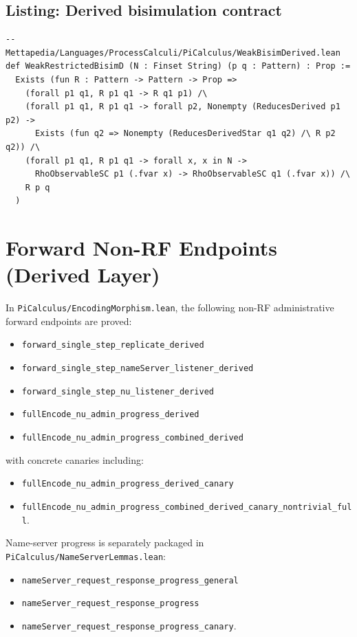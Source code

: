 \documentclass[11pt]{article}
\begin{document}
\subsection*{Listing: Derived bisimulation contract}
\begin{lstlisting}
-- Mettapedia/Languages/ProcessCalculi/PiCalculus/WeakBisimDerived.lean
def WeakRestrictedBisimD (N : Finset String) (p q : Pattern) : Prop :=
  Exists (fun R : Pattern -> Pattern -> Prop =>
    (forall p1 q1, R p1 q1 -> R q1 p1) /\
    (forall p1 q1, R p1 q1 -> forall p2, Nonempty (ReducesDerived p1 p2) ->
      Exists (fun q2 => Nonempty (ReducesDerivedStar q1 q2) /\ R p2 q2)) /\
    (forall p1 q1, R p1 q1 -> forall x, x in N ->
      RhoObservableSC p1 (.fvar x) -> RhoObservableSC q1 (.fvar x)) /\
    R p q
  )
\end{lstlisting}

\section{Forward Non-RF Endpoints (Derived Layer)}
In \texttt{PiCalculus/EncodingMorphism.lean}, the following non-RF administrative forward endpoints are proved:
\begin{itemize}
  \item \texttt{forward\_single\_step\_replicate\_derived}
  \item \texttt{forward\_single\_step\_nameServer\_listener\_derived}
  \item \texttt{forward\_single\_step\_nu\_listener\_derived}
  \item \texttt{fullEncode\_nu\_admin\_progress\_derived}
  \item \texttt{fullEncode\_nu\_admin\_progress\_combined\_derived}
\end{itemize}
with concrete canaries including:
\begin{itemize}
  \item \texttt{fullEncode\_nu\_admin\_progress\_derived\_canary}
  \item \texttt{fullEncode\_nu\_admin\_progress\_combined\_derived\_canary\_nontrivial\_full}.
\end{itemize}

Name-server progress is separately packaged in
\texttt{PiCalculus/NameServerLemmas.lean}:
\begin{itemize}
  \item \texttt{nameServer\_request\_response\_progress\_general}
  \item \texttt{nameServer\_request\_response\_progress}
  \item \texttt{nameServer\_request\_response\_progress\_canary}.
\end{itemize}
\end{document}
